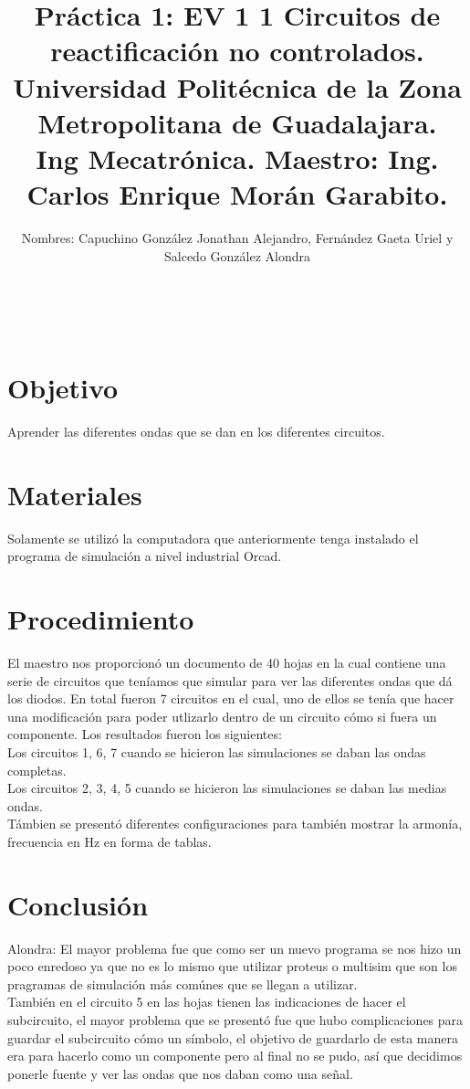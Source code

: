 \documentclass[12pt,letterpaper]{article}
\begin{document}
\maketitle

\title{Práctica 1: EV 1 1 Circuitos de reactificación no controlados.\\ Universidad Politécnica de la Zona Metropolitana de Guadalajara.\\ 
Ing Mecatrónica. Maestro: Ing. Carlos Enrique Morán Garabito.}\\
\author{Nombres: Capuchino González Jonathan Alejandro, Fernández Gaeta Uriel y Salcedo González Alondra}

\section{Objetivo}
Aprender las diferentes ondas que se dan en los diferentes circuitos.

\section{Materiales}
Solamente se utilizó la computadora que anteriormente tenga instalado el programa de simulación a nivel industrial Orcad.

\section{Procedimiento}
El maestro nos proporcionó un documento de 40 hojas en la cual contiene una serie de circuitos que teníamos que simular para ver las diferentes ondas que dá los diodos.
En total fueron 7 circuitos en el cual, uno de ellos se tenía que hacer una modificación para poder utlizarlo dentro de un circuito cómo si fuera un componente.
Los resultados fueron los siguientes:\\ 
Los circuitos 1, 6, 7 cuando se hicieron las simulaciones se daban las ondas completas.\\
Los circuitos 2, 3, 4, 5 cuando se hicieron las simulaciones se daban las medias ondas.\\
Támbien se presentó diferentes configuraciones para también mostrar la armonía, frecuencia en Hz en forma de tablas.

\section{Conclusión}
Alondra: El mayor problema fue que como ser un nuevo programa se nos hizo un poco enredoso ya que no es lo mismo que utilizar proteus o multisim que son los pragramas de simulación más comúnes que se llegan a utilizar.\\
También en el circuito 5 en las hojas tienen las indicaciones de hacer el subcircuito, el mayor problema que se presentó fue que hubo complicaciones para guardar el subcircuito cómo un símbolo, el objetivo de guardarlo de esta manera era para hacerlo como un componente pero al final no se pudo, así que decidimos ponerle fuente y ver las ondas que nos daban como una señal.
\end{document}
